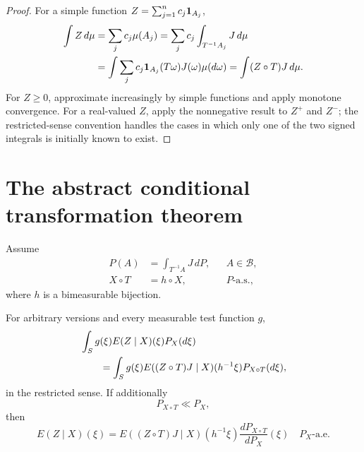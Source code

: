 \begin{proof}
For a simple function $Z=\sum_{j=1}^nc_j\mathbf{1}_{A_j}$,
\begin{align*}
 \int Z\,d\mu
 &=\sum_jc_j\mu(A_j)
 =\sum_jc_j\int_{T^{-1}A_j}J\,d\mu\\
 &=\int\sum_jc_j\mathbf{1}_{A_j}(T\omega)J(\omega)\mu(d\omega)
 =\int(Z\circ T)J\,d\mu.
\end{align*}
For $Z\ge0$, approximate increasingly by simple functions and apply monotone convergence.  For a real-valued $Z$, apply the nonnegative result to $Z^+$ and $Z^-$; the restricted-sense convention handles the cases in which only one of the two signed integrals is initially known to exist.
\end{proof}

\section{The abstract conditional transformation theorem}
Assume
\begin{align}
 P(A)&=\int_{T^{-1}A}J\,dP,
 &&A\in\mathcal B,\label{eq:Yeh-T1-1}\\
 X\circ T&=h\circ X,
 &&P\text{-a.s.},\label{eq:Yeh-T1-2}
\end{align}
where $h$ is a bimeasurable bijection.

\begin{theorem}\label{thm:Yeh-1}
For arbitrary versions and every measurable test function $g$,
\begin{align}
 &\int_Sg(\xi)E(Z\mid X)(\xi)P_X(d\xi)\notag\\
 &\qquad=
 \int_Sg(\xi)
 E((Z\circ T)J\mid X)(h^{-1}\xi)
 P_{X\circ T}(d\xi),\label{eq:Yeh-T1-integral}
\end{align}
in the restricted sense.  If additionally
\begin{equation}\label{eq:Yeh-AC}
 P_{X\circ T}\ll P_X,
\end{equation}
then
\begin{equation}\label{eq:Yeh-T1-pointwise}
 E(Z\mid X)(\xi)
 =E((Z\circ T)J\mid X)(h^{-1}\xi)
 \frac{dP_{X\circ T}}{dP_X}(\xi)
 \quad P_X\text{-a.e.}
\end{equation}
\end{theorem}

